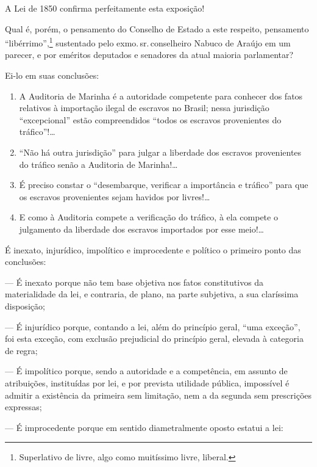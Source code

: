 {A Lei de 1850 confirma perfeitamente esta exposição!

\asterisc

Qual é, porém, o pensamento do Conselho de Estado a este respeito,
pensamento ``libérrimo'',\footnote{Superlativo de livre,
  algo como muitíssimo livre, liberal.} sustentado pelo exmo.\,sr.\,conselheiro Nabuco de Araújo em um parecer, e por eméritos deputados e
senadores da atual maioria parlamentar?

Ei-lo em suas conclusões:

\begin{enumerate}[label=\arabic*º]
\item A Auditoria de Marinha é a autoridade competente para conhecer dos
fatos relativos à importação ilegal de escravos no Brasil; nessa
jurisdição ``excepcional'' estão compreendidos ``todos os escravos
provenientes do tráfico''!\ldots{}

\item ``Não há outra jurisdição'' para julgar a liberdade dos escravos
provenientes do tráfico senão a Auditoria de Marinha!\ldots{}

\item É preciso constar o ``desembarque, verificar a importância e tráfico''
para que os escravos provenientes sejam havidos por livres!\ldots{}

\item E como à Auditoria compete a verificação do tráfico, à ela compete o
julgamento da liberdade dos escravos importados por esse meio!\ldots{}
\end{enumerate}

É inexato, injurídico, impolítico e improcedente e político o primeiro
ponto das conclusões:

--- É inexato porque não tem base objetiva nos fatos constitutivos da
materialidade da lei, e contraria, de plano, na parte subjetiva, a sua
claríssima disposição;

--- É injurídico porque, contando a lei, além do princípio geral, ``uma
exceção'', foi esta exceção, com exclusão prejudicial do princípio geral,
elevada à categoria de regra;

--- É impolítico porque, sendo a autoridade e a competência, em assunto
de atribuições, instituídas por lei, e por prevista utilidade pública,
impossível é admitir a existência da primeira sem limitação, nem a da
segunda sem prescrições expressas;

--- É improcedente porque em sentido diametralmente oposto estatui a
lei:

}
